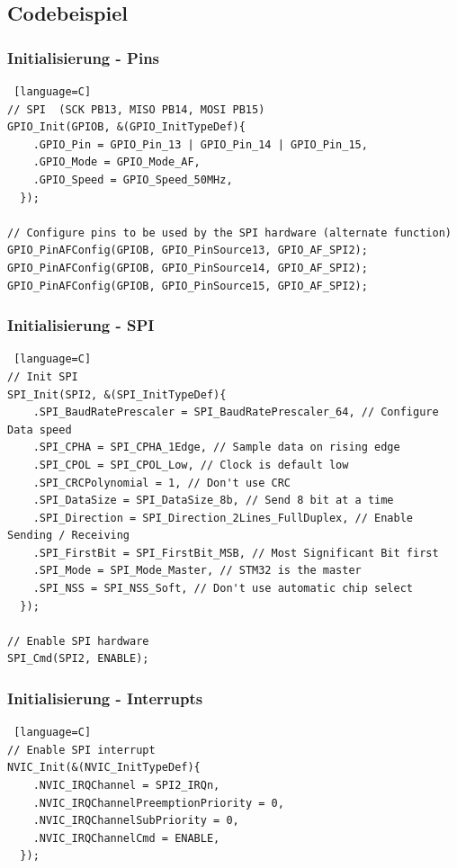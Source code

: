 \documentclass[ngerman,compress]{beamer}
\begin{document}
\subsection{Codebeispiel}

\begin{frame} [fragile]
	\frametitle{Initialisierung - Pins}
	\begin{lstlisting} [language=C]
// SPI  (SCK PB13, MISO PB14, MOSI PB15)
GPIO_Init(GPIOB, &(GPIO_InitTypeDef){
    .GPIO_Pin = GPIO_Pin_13 | GPIO_Pin_14 | GPIO_Pin_15,
    .GPIO_Mode = GPIO_Mode_AF,
    .GPIO_Speed = GPIO_Speed_50MHz,
  });

// Configure pins to be used by the SPI hardware (alternate function)
GPIO_PinAFConfig(GPIOB, GPIO_PinSource13, GPIO_AF_SPI2);
GPIO_PinAFConfig(GPIOB, GPIO_PinSource14, GPIO_AF_SPI2);
GPIO_PinAFConfig(GPIOB, GPIO_PinSource15, GPIO_AF_SPI2);
	\end{lstlisting}
\end{frame}

\begin{frame} [fragile]
	\frametitle{Initialisierung - SPI}
	\begin{lstlisting} [language=C]
// Init SPI
SPI_Init(SPI2, &(SPI_InitTypeDef){
    .SPI_BaudRatePrescaler = SPI_BaudRatePrescaler_64, // Configure Data speed
    .SPI_CPHA = SPI_CPHA_1Edge, // Sample data on rising edge
    .SPI_CPOL = SPI_CPOL_Low, // Clock is default low
    .SPI_CRCPolynomial = 1, // Don't use CRC
    .SPI_DataSize = SPI_DataSize_8b, // Send 8 bit at a time
    .SPI_Direction = SPI_Direction_2Lines_FullDuplex, // Enable Sending / Receiving
    .SPI_FirstBit = SPI_FirstBit_MSB, // Most Significant Bit first
    .SPI_Mode = SPI_Mode_Master, // STM32 is the master
    .SPI_NSS = SPI_NSS_Soft, // Don't use automatic chip select
  });

// Enable SPI hardware
SPI_Cmd(SPI2, ENABLE);
	\end{lstlisting}
\end{frame}

\begin{frame} [fragile]
	\frametitle{Initialisierung - Interrupts}
	\begin{lstlisting} [language=C]
// Enable SPI interrupt
NVIC_Init(&(NVIC_InitTypeDef){
    .NVIC_IRQChannel = SPI2_IRQn,
    .NVIC_IRQChannelPreemptionPriority = 0,
    .NVIC_IRQChannelSubPriority = 0,
    .NVIC_IRQChannelCmd = ENABLE,
  });
	\end{lstlisting}
\end{frame}
\end{document}
